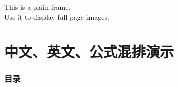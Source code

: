 \documentclass[9pt,aspectratio=169]{ctexbeamer}
\begin{document}
\begin{frame}[plain]
	\begin{center}
	  This is a plain frame.\\
	  Use it to display full page images.
	  \end{center}
\end{frame}

\section{中文、英文、公式混排演示}

\begin{frame}[noframenumbering]
  \frametitle{目录}
  \tableofcontents[sectionstyle=show/shaded,subsectionstyle=show/show/hide,subsubsectionstyle=hide]
\end{frame}
\end{document}
